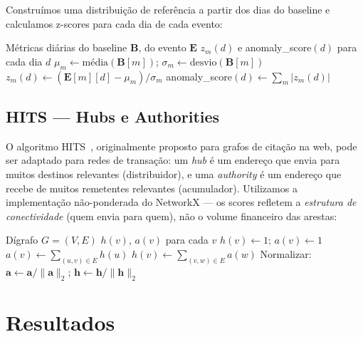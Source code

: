 \documentclass[12pt,a4paper]{article}
\begin{document}
Construímos uma distribuição de referência a partir dos dias do baseline e calculamos z-scores para cada dia de cada evento:

\begin{algorithm}[H]
\caption{Detecção de Anomalia via Z-score}
\begin{algorithmic}[1]
\Require Métricas diárias do baseline $\mathbf{B}$, do evento $\mathbf{E}$
\Ensure $z_m(d)$ e anomaly\_score$(d)$ para cada dia $d$
  \State $\mu_m \gets \text{média}(\mathbf{B}[m])$; \quad $\sigma_m \gets \text{desvio}(\mathbf{B}[m])$
\EndFor
{}
    \State $z_m(d) \gets (\mathbf{E}[m][d] - \mu_m) / \sigma_m$
  \EndFor
  \State anomaly\_score$(d) \gets \sum_m |z_m(d)|$
\EndFor
\end{algorithmic}
\end{algorithm}

\subsection{HITS --- Hubs e Authorities}

O algoritmo HITS~\cite{kleinberg1999}, originalmente proposto para grafos de citação na web, pode ser adaptado para redes de transação: um \textit{hub} é um endereço que envia para muitos destinos relevantes (distribuidor), e uma \textit{authority} é um endereço que recebe de muitos remetentes relevantes (acumulador). Utilizamos a implementação não-ponderada do NetworkX --- os scores refletem a \textit{estrutura de conectividade} (quem envia para quem), não o volume financeiro das arestas:

\begin{algorithm}[H]
\caption{HITS (Kleinberg)}
\begin{algorithmic}[1]
\Require Dígrafo $G = (V, E)$
\Ensure $h(v)$, $a(v)$ para cada $v$
 $h(v) \gets 1$; $a(v) \gets 1$ \EndFor
\Repeat
   $a(v) \gets \sum_{(u,v) \in E} h(u)$ \EndFor
   $h(v) \gets \sum_{(v,w) \in E} a(w)$ \EndFor
  \State Normalizar: $\mathbf{a} \gets \mathbf{a}/\|\mathbf{a}\|_2$; \quad $\mathbf{h} \gets \mathbf{h}/\|\mathbf{h}\|_2$
\end{algorithmic}
\end{algorithm}

\section{Resultados}
\end{document}
